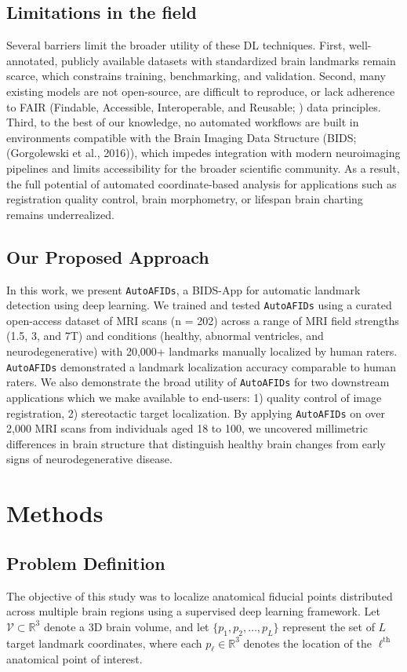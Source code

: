 \subsection{Limitations in the field}
Several barriers limit the broader utility of these DL techniques. First, well-annotated, publicly available datasets with standardized brain landmarks remain scarce, which constrains training, benchmarking, and validation. Second, many existing models are not open-source, are difficult to reproduce, or lack adherence to FAIR (Findable, Accessible, Interoperable, and Reusable; \cite{Wilkinson2016-it}) data principles. Third, to the best of our knowledge, no automated workflows are built in environments compatible with the Brain Imaging Data Structure (BIDS; (Gorgolewski et al., 2016)), which impedes integration with modern neuroimaging pipelines and limits accessibility for the broader scientific community. As a result, the full potential of automated coordinate-based analysis for applications such as registration quality control, brain morphometry, or lifespan brain charting remains underrealized.

\subsection{Our Proposed Approach}
In this work, we present \texttt{AutoAFIDs}, a BIDS-App for automatic landmark detection using deep learning. We trained and tested \texttt{AutoAFIDs} using a curated open-access dataset of MRI scans (n = 202) across a range of MRI field strengths (1.5, 3, and 7T) and conditions (healthy, abnormal ventricles, and neurodegenerative) with 20,000+ landmarks manually localized by human raters. \texttt{AutoAFIDs} demonstrated a landmark localization accuracy comparable to human raters. We also demonstrate the broad utility of \texttt{AutoAFIDs} for two downstream applications which we make available to end-users: 1) quality control of image registration, 2) stereotactic target localization. By applying \texttt{AutoAFIDs} on over 2,000 MRI scans from individuals aged 18 to 100, we uncovered millimetric differences in brain structure that distinguish healthy brain changes from early signs of neurodegenerative disease.

\section{Methods}
\subsection{Problem Definition}
\label{sec:problemstatement}
The objective of this study was to localize anatomical fiducial points distributed across multiple brain regions using a supervised deep learning framework. Let $\mathcal{V} \subset \mathbb{R}^3$ denote a 3D brain volume, and let $\{p_1, p_2, \ldots, p_L\}$ represent the set of $L$ target landmark coordinates, where each $p_\ell \in \mathbb{R}^3$ denotes the location of the $\ell^{\text{th}}$ anatomical point of interest.

